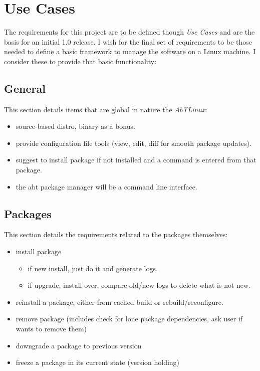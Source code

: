 \section{Use Cases}
The requirements for this project are to be defined though \emph{Use Cases}
and are the basis for an initial 1.0 release. I wish for the final set of
requirements to be those needed to define a basic framework to manage the
software on a Linux machine. I consider these to provide that basic
functionality:

\subsection{General}
This section details items that are global in nature the \emph{AbTLinux}:

\begin{itemize}
\item source-based distro, binary as a bonus.
\item provide configuration file tools (view, edit, diff for smooth package updates).
\item suggest to install package if not installed and a command is entered from that package.
\item the abt package manager will be a command line interface.
\end{itemize}


\subsection{Packages}
This section details the requirements related to the packages themselves:

\begin{itemize}
\item install package
 
	\begin{itemize}
			\item if new install, just do it and generate logs.
			\item if upgrade, install over, compare old/new logs to delete what is not new.
	\end{itemize}

\item reinstall a package, either from cached build or rebuild/reconfigure.
\item remove package (includes check for lone package dependencies, ask user if wants to remove them)
\item downgrade a package to previous version
\item freeze a package in its current state (version holding)
\end{itemize}

